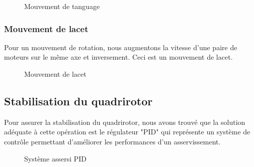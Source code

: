 	
	\begin{figure}[H] 
	\begin{center}
		\centering
	\end{center}
	\caption{Mouvement de tanguage}
	\end{figure}
	
	\subsubsection{Mouvement de lacet}
	Pour un mouvement de rotation, nous augmentons la vitesse d'une paire de moteurs sur le même axe et inversement. Ceci est un mouvement de lacet.
	\begin{figure} [H]
	\begin{center}
	\end{center}
	\caption{Mouvement de lacet}	
\end{figure}
\subsection {Stabilisation du quadrirotor}
Pour assurer la stabilisation du quadrirotor, nous avons trouvé que la solution adéquate à cette opération est le régulateur "PID" qui représente un système de contrôle permettant d’améliorer les performances d'un asservissement\cite{Wikipideab}.
	\begin{figure}[H] 
	\begin{center}
		\centering
	\end{center}
	\caption{Système assersi PID}
\end{figure}

